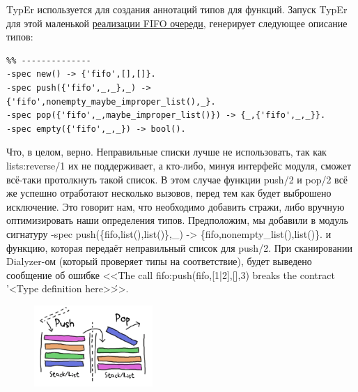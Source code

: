 \documentclass[a4paper,12pt]{report}
\newcommand{\ops}{\colorbox{lgreen}}
\begin{document}
TypEr используется для создания аннотаций типов для функций. Запуск TypEr для этой маленькой \href{http://learnyousomeerlang.com/static/erlang/fifo.erl}{реализации FIFO очереди}, генерирует следующее описание типов:
\begin{lstlisting}[style=erlang]
%% File: fifo.erl
%% --------------
-spec new() -> {'fifo',[],[]}.
-spec push({'fifo',_,_},_) -> {'fifo',nonempty_maybe_improper_list(),_}.
-spec pop({'fifo',_,maybe_improper_list()}) -> {_,{'fifo',_,_}}.
-spec empty({'fifo',_,_}) -> bool().
\end{lstlisting}

Что, в целом, верно. Неправильные списки лучше не использовать, так как \ops{lists:reverse/1} их не поддерживает, а кто\--либо, минуя интерфейс модуля, сможет всё\--таки протолкнуть такой список. В этом случае функции \ops{push/2} и \ops{pop/2} всё же успешно отработают несколько вызовов, перед тем как будет выброшено исключение. Это говорит нам, что необходимо добавить стражи, либо вручную оптимизировать наши определения типов. Предположим, мы добавили в модуль сигнатуру \ops{-spec push(\{fifo,list(),list()\},\_) -> \{fifo,nonempty\_list(),list()\}.} и функцию, которая передаёт неправильный список для \ops{push/2}. При сканировании Dialyzer\--ом (который проверяет типы на соответствие), будет выведено сообщение об ошибке <<The call fifo:push({fifo,[1|2],[]},3) breaks the contract '<Type definition here>\'>>.
\begin{figure}[h!]
    \includegraphics[width=0.4\textwidth]{fifo.png}
\end{figure} 
\end{document}
